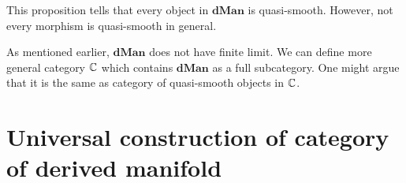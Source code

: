 This proposition tells that every object in $\textbf{dMan}$ is quasi-smooth. However, not every morphism is quasi-smooth in general. 

\begin{rem}
    As mentioned earlier, $\textbf{dMan}$ does not have finite limit. We can define more general category $\mathbb C$ which contains $\textbf{dMan}$ as a full subcategory. One might argue that it is the same as category of quasi-smooth objects in $\mathbb C$. 
\end{rem}

\section{Universal construction of category of derived manifold}